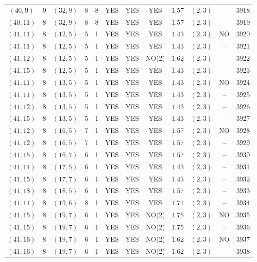 \begin{longtable}{|c|c|c|c|c|c|c|c|c|c|c|c|}
$(40,9)$ & 9 & $(32,9)$ & 8 & 8 & YES & YES & YES & $1.57$ & $(2,3)$ & -- & 3918\\
$(40,11)$ & 8 & $(32,9)$ & 8 & 8 & YES & YES & YES & $1.57$ & $(2,3)$ & -- & 3919\\
$(41,11)$ & 8 & $(12,5)$ & 5 & 1 & YES & YES & YES & $1.43$ & $(2,3)$ & NO & 3920\\
$(41,11)$ & 8 & $(12,5)$ & 5 & 1 & YES & YES & YES & $1.43$ & $(2,3)$ & -- & 3921\\
$(41,12)$ & 8 & $(12,5)$ & 5 & 1 & YES & YES & NO(2) & $1.62$ & $(2,3)$ & -- & 3922\\
$(41,15)$ & 8 & $(12,5)$ & 5 & 1 & YES & YES & YES & $1.43$ & $(2,3)$ & -- & 3923\\
$(41,11)$ & 8 & $(13,5)$ & 5 & 1 & YES & YES & YES & $1.43$ & $(2,3)$ & NO & 3924\\
$(41,11)$ & 8 & $(13,5)$ & 5 & 1 & YES & YES & YES & $1.43$ & $(2,3)$ & -- & 3925\\
$(41,12)$ & 8 & $(13,5)$ & 5 & 1 & YES & YES & YES & $1.43$ & $(2,3)$ & -- & 3926\\
$(41,15)$ & 8 & $(13,5)$ & 5 & 1 & YES & YES & YES & $1.43$ & $(2,3)$ & -- & 3927\\
$(41,12)$ & 8 & $(16,5)$ & 7 & 1 & YES & YES & YES & $1.57$ & $(2,3)$ & NO & 3928\\
$(41,12)$ & 8 & $(16,5)$ & 7 & 1 & YES & YES & YES & $1.57$ & $(2,3)$ & -- & 3929\\
$(41,15)$ & 8 & $(16,7)$ & 6 & 1 & YES & YES & YES & $1.57$ & $(2,3)$ & -- & 3930\\
$(41,11)$ & 8 & $(17,5)$ & 6 & 1 & YES & YES & YES & $1.43$ & $(2,3)$ & -- & 3931\\
$(41,15)$ & 8 & $(17,7)$ & 6 & 1 & YES & YES & YES & $1.43$ & $(2,3)$ & -- & 3932\\
$(41,18)$ & 8 & $(18,5)$ & 6 & 1 & YES & YES & YES & $1.57$ & $(2,3)$ & -- & 3933\\
$(41,11)$ & 8 & $(19,6)$ & 8 & 1 & YES & YES & YES & $1.71$ & $(2,3)$ & -- & 3934\\
$(41,15)$ & 8 & $(19,7)$ & 6 & 1 & YES & YES & NO(2) & $1.75$ & $(2,3)$ & NO & 3935\\
$(41,15)$ & 8 & $(19,7)$ & 6 & 1 & YES & YES & NO(2) & $1.75$ & $(2,3)$ & -- & 3936\\
$(41,16)$ & 8 & $(19,7)$ & 6 & 1 & YES & YES & NO(2) & $1.62$ & $(2,3)$ & NO & 3937\\
$(41,16)$ & 8 & $(19,7)$ & 6 & 1 & YES & YES & NO(2) & $1.62$ & $(2,3)$ & -- & 3938\\

\end{longtable}
